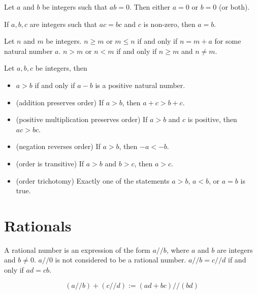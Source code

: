 \documentclass{blog}
\begin{document}
\begin{proposition}
  Let $a$ and $b$ be integers such that $a b = 0$.
  Then either $a = 0$ or $b = 0$ (or both).
\end{proposition}

\begin{proposition}
  If $a, b , c$ are integers such that $a c = b c$ and $c$ is non-zero, then $a = b$.
\end{proposition}

\begin{definition}[order]
  Let $n$ and $m$ be integers.
  $n \geq m$ or $m \leq n$ if and only if $n = m + a$ for some natural number $a$.
  $n > m$ or $n < m$ if and only if $n \geq m$ and $n \neq m$.
\end{definition}

\begin{lemma}
  Let $a, b, c$ be integers, then
  \begin{itemize}
  \item $a > b$ if and only if $a - b$ is a positive natural number.
  \item (addition preserves order)
    If $a > b$, then $a + c > b + c$.
  \item (positive multiplication preserves order)
    If $a > b$ and $c$ is positive, then $a c > b c$.
  \item (negation reverses order)
    If $a > b$, then $-a < -b$.
  \item (order is transitive)
    If $a > b$ and $b > c$, then $a > c$.
  \item (order trichotomy)
    Exactly one of the statements $a > b$, $a < b$, or $a = b$ is true.
  \end{itemize}
\end{lemma}

\section{Rationals}
\begin{definition}[$\mathbb{Q}$]
  A rational number is an expression of the form $a // b$,
  where $a$ and $b$ are integers and $b \neq 0$.
  $a // 0$ is not considered to be a rational number.
  $a // b = c // d$ if and only if $a d = c b$.
\end{definition}

\begin{definition}[sum]
  \begin{equation}
    (a // b) + (c // d) := (a d + b c) // (b d)
  \end{equation}
\end{definition}
\end{document}
